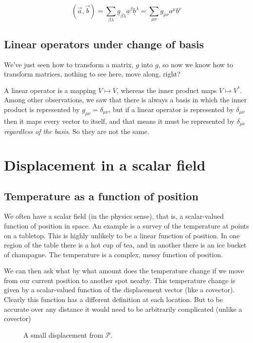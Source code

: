 $$
(\vec{a}, \vec{b})
= 
\sum_{\beta\lambda} \underline{g}_{\beta\lambda} \underline{a}^{\beta} \underline{b}^{\lambda}
= 
\sum_{\mu\nu} g_{\mu\nu} a^{\mu} b^{\nu}
$$

\subsection{Linear operators under change of basis}

We've just seen how to transform a matrix, $g$ into $g$, so now we know how to transform matrices, nothing to see here, move along, right?

A linear operator is a mapping $V \mapsto V$, whereas the inner product maps $V \mapsto V^*$. Among other observations, we saw that there is always a basis in which the inner product is represented by $g_{\mu\nu} = \delta_{\mu\nu}$, but if a linear operator is represented by $\delta_{\mu\nu}$ then it maps every vector to itself, and that means it must be represented by $\delta_{\mu\nu}$ \textit{regardless of the basis}. So they are not the same.




\section{Displacement in a scalar field}

\subsection{Temperature as a function of position}

We often have a scalar field (in the physics sense), that is, a scalar-valued function of position in space. An example is a survey of the temperature at points on a tabletop. This is highly unlikely to be a linear function of position. In one region of the table there is a hot cup of tea, and in another there is an ice bucket of champagne. The temperature is a complex, messy function of position.

We can then ask what by what amount does the temperature change if we move from our current position to another spot nearby. This temperature change is given by a scalar-valued function of the displacement vector (like a covector). Clearly this function has a different definition at each location. But to be accurate over any distance it would need to be arbitrarily complicated (unlike a covector)

\begin{figure}[h]
    \centering
    \caption{A small displacement from $\mathcal{P}$.} \label{fig:vector-displacement}
\end{figure}

